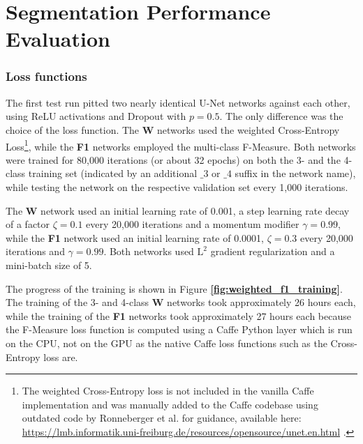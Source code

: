 	\section{Segmentation Performance Evaluation}

	\subsubsection{Loss functions}

\noindent The first test run pitted two nearly identical U-Net networks against each other, using ReLU activations and Dropout with $p = 0.5$. The only difference was the choice of the loss function. The \textbf{W} networks used the weighted Cross-Entropy Loss\footnote{The weighted Cross-Entropy loss is not included in the vanilla Caffe implementation and was manually added to the Caffe codebase using outdated code by Ronneberger et al.  for guidance, available here: \url{https://lmb.informatik.uni-freiburg.de/resources/opensource/unet.en.html} .}, while the \textbf{F1} networks employed the multi-class F-Measure. Both networks were trained for 80,000 iterations (or about 32 epochs) on both the 3- and the 4-class training set (indicated by an additional $\_3$ or $\_4$ suffix in the network name), while testing the network on the respective validation set every 1,000 iterations.

The \textbf{W} network used an initial learning rate of 0.001, a step learning rate decay of a factor $\zeta = 0.1$ every 20,000 iterations and a momentum modifier $\gamma = 0.99$, while the \textbf{F1} network used an initial learning rate of 0.0001, $\zeta = 0.3$ every 20,000 iterations and $\gamma = 0.99$. Both networks used $\text{L}^2$ gradient regularization and a mini-batch size of 5.

The progress of the training is shown in Figure \textbf{\ref{fig:weighted_f1_training}}. The training of the 3- and 4-class \textbf{W} networks took approximately 26 hours each, while the training of the \textbf{F1} networks took approximately 27 hours each because the F-Measure loss function is computed using a Caffe Python layer which is run on the CPU, not on the GPU as the native Caffe loss functions such as the Cross-Entropy loss are.\\

